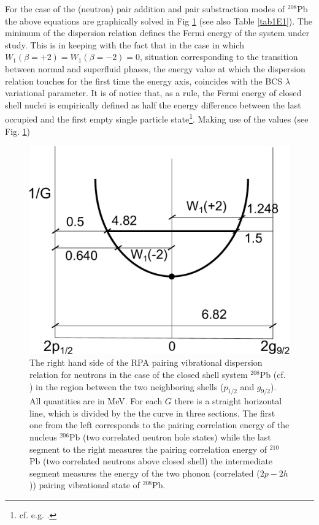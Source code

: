 For the case of the (neutron) pair addition and pair substraction modes of $^{208}$Pb the above equations are  graphically solved in Fig \ref{fig1E1} (see also Table \ref{tab1E1}). The minimum of the dispersion relation defines the Fermi energy of the system under study. This is in keeping with the fact that in the case in which $W_1 (\beta=+2)=W_1(\beta=-2)=0$, situation corresponding to the  transition between normal and superfluid phases, the energy value at which the dispersion relation touches for the first time the energy axis, coincides with the BCS $\lambda$ variational parameter. It is of notice that, as a rule, the Fermi energy of closed shell nuclei is empirically defined as half the energy difference between the last occupied and the first empty single particle state\footnote{cf. e.g. \cite{Mahaux:85}.}. Making use of the values (see Fig. \ref{fig1E1})
  \begin{figure}
  \centerline{\includegraphics*[width=\textwidth,angle=0]{nutshell/figs/dispersion.pdf}}
  \caption{The right hand side of the RPA pairing vibrational dispersion relation for neutrons in the case of the closed shell system $^{208}$Pb (cf. \cite{Bes:66}) in the region between the two neighboring shells ($p_{1/2}$ and $g_{9/2}$). All quantities are in MeV. For each $G$ there is a straight horizontal line, which is divided by the the curve in three sections. The first one from the left corresponds to the pairing correlation energy of the nucleus $^{206}$Pb (two correlated neutron hole states) while the last segment to the right measures the pairing correlation energy of $^{210}$Pb (two correlated neutrons above closed shell) the intermediate segment measures the energy of the two phonon (correlated ($2p-2h$)) pairing vibrational state  of $^{208}$Pb.}\label{fig1E1}
  \end{figure}
